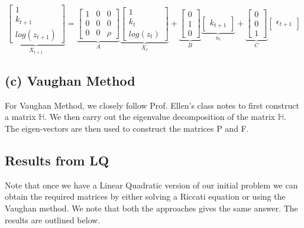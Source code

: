 \documentclass[12pt]{article}
\begin{document}
$$\underbrace{\begin{bmatrix} 1 \\ k_{t+1} \\ log(z_{t+1})\end{bmatrix}}_{X_{t+1}} = \underbrace{\begin{bmatrix}
1 & 0 & 0\\ 0 & 0 & 0 \\ 0 & 0 & \rho \end{bmatrix}}_{A} \underbrace{\begin{bmatrix} 1 \\ k_t \\ log(z_t)\end{bmatrix}}_{X_t} + \underbrace{\begin{bmatrix} 0 \\ 1 \\ 0 \end{bmatrix}}_{B} \underbrace{\begin{bmatrix}k_{t+1} \end{bmatrix}}_{u_t} + \underbrace{\begin{bmatrix} 0 \\ 0 \\ 1 \end{bmatrix}}_{C} \begin{bmatrix} \epsilon_{t+1} \end{bmatrix}  $$ 


\subsection{(c) Vaughan Method}
For Vaughan Method, we closely follow Prof. Ellen's class notes to first construct a matrix $\mathbb{H}$. We then carry out the eigenvalue decomposition of the matrix $\mathbb{H}$. The eigen-vectors are then used to construct the matrices P and F.

\subsection{Results from LQ}
Note that once we have a Linear Quadratic version of our initial problem we can obtain the required matrices by either solving a Riccati equation or using the Vaughan method. We note that both the approaches gives the same answer. The results are outlined below.
\end{document}
